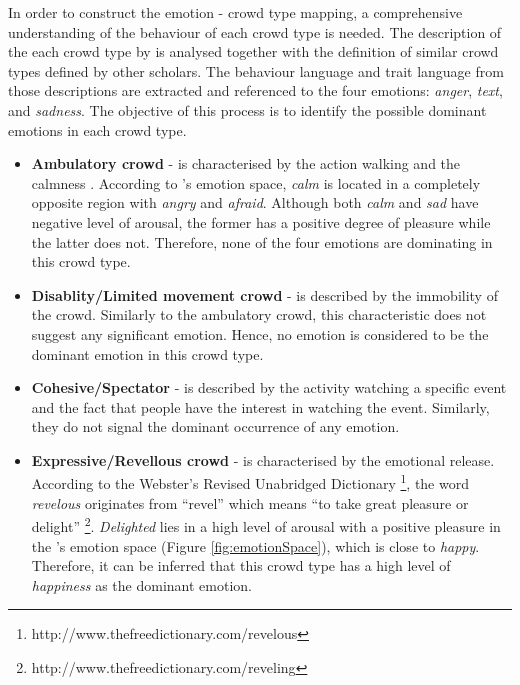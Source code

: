 In order to construct the emotion - crowd type mapping, a comprehensive understanding of the behaviour of each crowd type is needed. The description of the each crowd type by \citet{Berlonghi1995} is analysed together with the definition of similar crowd types defined by other scholars. The behaviour language and trait language from those descriptions are extracted and referenced to the four emotions: \textit{anger}, \textit{text},  and \textit{sadness}. The objective of this process is to identify the possible dominant emotions in each crowd type. 

\begin{itemize}
\item \textbf{Ambulatory crowd} - is characterised by the action walking and the calmness \citep{Zeitz2009}. According to \citet{russell1980circumplex}'s emotion space, \textit{calm} is located in a completely opposite region with \textit{angry} and \textit{afraid}. Although both \textit{calm} and \textit{sad} have negative level of arousal, the former has a positive degree of pleasure while the latter does not. Therefore, none of the four emotions are dominating in this crowd type.

\item \textbf{Disablity/Limited movement crowd} - is described by the immobility of the crowd. Similarly to the ambulatory crowd, this characteristic does not suggest any significant emotion. Hence, no emotion is considered to be the dominant emotion in this crowd type.

\item \textbf{Cohesive/Spectator} - is described by the activity watching a specific event and the fact that people have the interest in watching the event. Similarly, they do not signal the dominant occurrence of any emotion.

\item \textbf{Expressive/Revellous crowd} - is characterised by the emotional release. According to the Webster's Revised Unabridged Dictionary \footnote{http://www.thefreedictionary.com/revelous}, the word \textit{revelous} originates from ``revel'' which means ``to take great pleasure or delight'' \footnote{http://www.thefreedictionary.com/reveling}. \textit{Delighted} lies in a high level of arousal with a positive pleasure in the \citet{russell1980circumplex}'s emotion space (Figure \ref{fig:emotionSpace}), which is close to \textit{happy}. Therefore, it can be inferred that this crowd type has a high level of \textit{happiness} as the dominant emotion.


\end{itemize}
